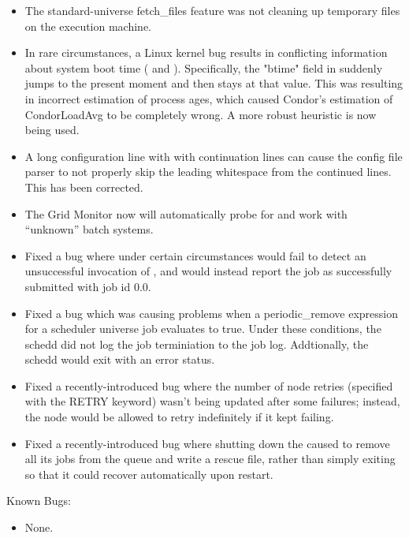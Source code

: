 \begin{itemize}

\item The standard-universe fetch\_files feature was not cleaning up
temporary files on the execution machine.

\item In rare circumstances, a Linux kernel bug results in conflicting
information about system boot time ( and
). 
Specifically, the "btime" field in  suddenly jumps to
the present moment and then stays at that value.  This
was resulting in incorrect estimation of process ages, which caused
Condor's estimation of CondorLoadAvg to be completely wrong.  A more
robust heuristic is now being used.

\item A long configuration line with with continuation lines can cause the
config file parser to not properly skip the leading whitespace from
the continued lines.  This has been corrected.

\item The Grid Monitor now will automatically probe for and work with
``unknown'' batch systems.

\item Fixed a bug where under certain circumstances 
      would fail to detect an unsuccessful invocation of
      , and would instead report the job as
      successfully submitted with job id 0.0.

\item Fixed a bug which was causing problems when a periodic\_remove
expression for a scheduler universe job evaluates to true.  Under
these conditions, the schedd did not log the job terminiation to the
job log.  Addtionally, the schedd would exit with an error status.

\item Fixed a recently-introduced  bug where the number
      of node retries (specified with the RETRY keyword) wasn't being
      updated after some failures; instead, the node would be allowed
      to retry indefinitely if it kept failing.

\item Fixed a recently-introduced bug where shutting down the
       caused  to remove all its jobs
      from the queue and write a rescue file, rather than simply
      exiting so that it could recover automatically upon restart.

\end{itemize}

\noindent Known Bugs:

\begin{itemize}

\item None.

\end{itemize}


